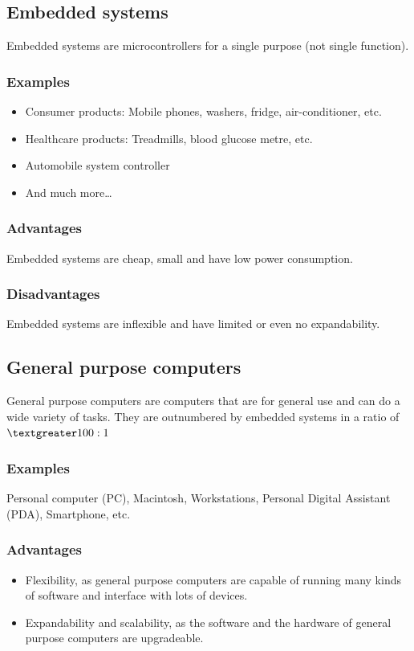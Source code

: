 \documentclass[11pt]{article}
\begin{document}
\subsection{Embedded systems}
\label{sec:org081b0ab}
Embedded systems are microcontrollers for a single purpose (not single function).
\subsubsection{Examples}
\label{sec:org54cb932}
\begin{itemize}
\item Consumer products: Mobile phones, washers, fridge, air-conditioner, etc.
\item Healthcare products: Treadmills, blood glucose metre, etc.
\item Automobile system controller
\item And much more\ldots{}
\end{itemize}
\subsubsection{Advantages}
\label{sec:orge447be9}
Embedded systems are cheap, small and have low power consumption.
\subsubsection{Disadvantages}
\label{sec:orgd690330}
Embedded systems are inflexible and have limited or even no expandability.
\subsection{General purpose computers}
\label{sec:org8132c2f}
General purpose computers are computers that are for general use and can do a wide variety of tasks. They are outnumbered by embedded systems in a ratio of \(\textgreater 100:1\)
\subsubsection{Examples}
\label{sec:orgc9d6123}
Personal computer (PC), Macintosh, Workstations, Personal Digital Assistant (PDA), Smartphone, etc.
\subsubsection{Advantages}
\label{sec:orgfcec580}
\begin{itemize}
\item Flexibility, as general purpose computers are capable of running many kinds of software and interface with lots of devices.
\item Expandability and scalability, as the software and the hardware of general purpose computers are upgradeable.
\end{itemize}
\end{document}
